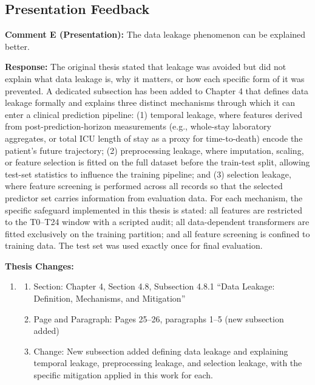 \documentclass[12pt,a4paper]{article}
\begin{document}
\begin{flushleft}
\subsection*{Presentation Feedback}

\vspace{\baselineskip}

\textbf{Comment E (Presentation):} The data leakage phenomenon can be explained better.

\vspace{\baselineskip}

\textbf{Response:} The original thesis stated that leakage was avoided but did not explain what data leakage is, why it matters, or how each specific form of it was prevented. A dedicated subsection has been added to Chapter 4 that defines data leakage formally and explains three distinct mechanisms through which it can enter a clinical prediction pipeline: (1) temporal leakage, where features derived from post-prediction-horizon measurements (e.g., whole-stay laboratory aggregates, or total ICU length of stay as a proxy for time-to-death) encode the patient's future trajectory; (2) preprocessing leakage, where imputation, scaling, or feature selection is fitted on the full dataset before the train-test split, allowing test-set statistics to influence the training pipeline; and (3) selection leakage, where feature screening is performed across all records so that the selected predictor set carries information from evaluation data. For each mechanism, the specific safeguard implemented in this thesis is stated: all features are restricted to the T0--T24 window with a scripted audit; all data-dependent transformers are fitted exclusively on the training partition; and all feature screening is confined to training data. The test set was used exactly once for final evaluation.

\vspace{\baselineskip}

\textbf{Thesis Changes:}
\begin{enumerate}
    \item
    \begin{enumerate}
        \item Section: Chapter 4, Section 4.8, Subsection 4.8.1 ``Data Leakage: Definition, Mechanisms, and Mitigation''
        \item Page and Paragraph: Pages 25--26, paragraphs 1--5 (new subsection added)
        \item Change: New subsection added defining data leakage and explaining temporal leakage, preprocessing leakage, and selection leakage, with the specific mitigation applied in this work for each.
    \end{enumerate}
\end{enumerate}


\end{flushleft}
\end{document}
